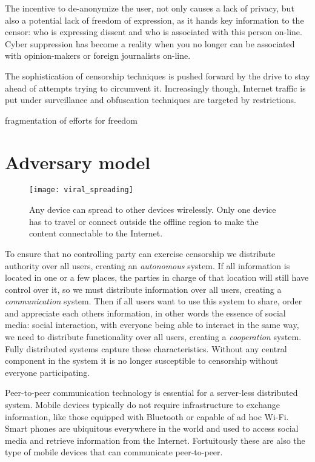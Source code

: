 The incentive to de-anonymize the user, not only causes a lack of privacy, but also a potential lack of freedom of expression, as it hands key information to the censor: who is expressing dissent and who is associated with this person on-line.
Cyber suppression has become a reality when you no longer can be associated with opinion-makers or foreign journalists on-line.




The sophistication of censorship techniques is pushed forward by the drive to stay ahead of attempts trying to circumvent it.
Increasingly though, Internet traffic is put under surveillance and obfuscation techniques are targeted by restrictions.


fragmentation of efforts for freedom


\section{Adversary model}
\pagebreak

\begin{figure}[h]
	\centering
	\texttt{[image: viral\_spreading]}
	\caption{Any device can spread to other devices wirelessly.
		Only one device has to travel or connect outside the offline region to make the content connectable to the Internet.}
	\label{fig:viral_spreading}
\end{figure}



To ensure that no controlling party can exercise censorship we distribute authority over all users, creating an \emph{autonomous} system.
If all information is located in one or a few places, the parties in charge of that location will still have control over it, so we must distribute information over all users, creating a \emph{communication} system.
Then if all users want to use this system to share, order and appreciate each others information, in other words the essence of social media: social interaction, with everyone being able to interact in the same way, we need to  distribute functionality over all users, creating a \emph{cooperation} system.
Fully distributed systems capture these characteristics. %
Without any central component in the system it is no longer susceptible to censorship without everyone participating.

Peer-to-peer communication technology is essential for a server-less distributed system.
Mobile devices typically do not require infrastructure to exchange information, like those equipped with Bluetooth or capable of ad hoc Wi-Fi.
Smart phones are ubiquitous everywhere in the world and used to access social media and retrieve information from the Internet.
Fortuitously these are also the type of mobile devices that can communicate peer-to-peer.






